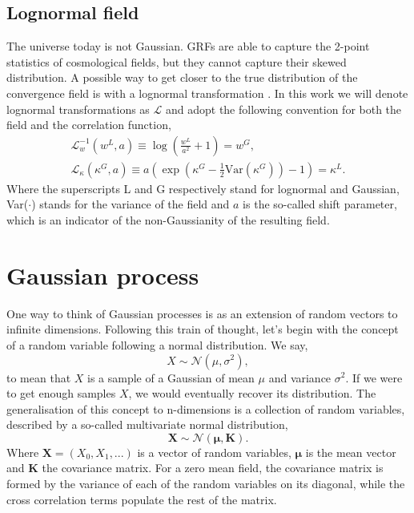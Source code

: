 \subsection{Lognormal field}
The universe today is not Gaussian. GRFs are able to capture the 2-point statistics of cosmological fields, but they cannot capture their skewed distribution. A possible way to get closer to the true distribution of the convergence field is with a lognormal transformation \cite{lognormal} \cite{lognormal2} \cite{lognormal3} \cite{fwdmodel}. In this work we will denote lognormal transformations as $\mathcal{L}$ and adopt the following convention for both the field and the correlation function,
\begin{gather}
    \label{eq:L_w}
    \mathcal{L}_w^{-1}(w^{L}, a) \equiv \log \left(\frac{w^{L}}{a^2}+1\right) = w^G,\\
    \label{eq:L_k}
    \mathcal{L}_\kappa(\kappa^G, a) \equiv a\left(\exp(\kappa^G-\tfrac{1}{2}\text{Var}(\kappa^G)) -1\right) = \kappa^{L}.
\end{gather}
Where the superscripts L and G respectively stand for lognormal and Gaussian, Var($\cdot$) stands for the variance of the field and $a$ is the so-called shift parameter, which is an indicator of the non-Gaussianity of the resulting field.

\section{Gaussian process}
\label{sec:gaussian process}
One way to think of Gaussian processes is as an extension of random vectors to infinite dimensions. Following this train of thought, let's begin with the concept of a random variable following a normal distribution. We say,
\begin{equation*}
    X \sim \mathcal{N}\left(\mu, \sigma^2\right),
\end{equation*}
to mean that $X$ is a sample of a Gaussian of mean $\mu$ and variance $\sigma^2$. If we were to get enough samples $X$, we would eventually recover its distribution. The generalisation of this concept to n-dimensions is a collection of random variables, described by a so-called multivariate normal distribution,
\begin{equation*}
    \bm{X} \sim \mathcal{N}\left(\bm{\mu}, \bm{K}\right).
\end{equation*}
Where $\bm{X}=(X_0,X_1,...)$ is a vector of random variables, $\bm{\mu}$ is the mean vector and $\bm{K}$ the covariance matrix. For a zero mean field, the covariance matrix is formed by the variance of each of the random variables on its diagonal, while the cross correlation terms populate the rest of the matrix. 
